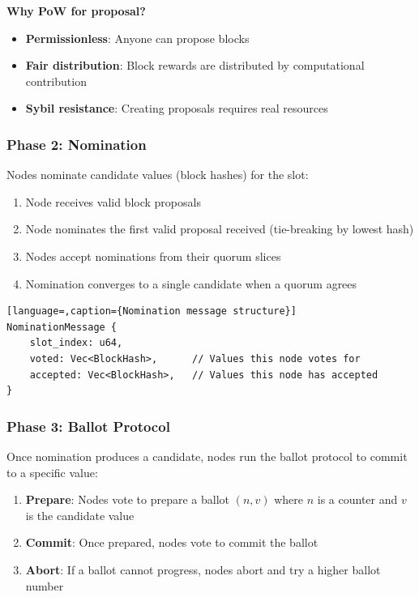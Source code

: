\textbf{Why PoW for proposal?}
\begin{itemize}
  \item \textbf{Permissionless}: Anyone can propose blocks
  \item \textbf{Fair distribution}: Block rewards are distributed by
    computational contribution
  \item \textbf{Sybil resistance}: Creating proposals requires real resources
\end{itemize}

\subsubsection{Phase 2: Nomination}

Nodes nominate candidate values (block hashes) for the slot:

\begin{enumerate}
  \item Node receives valid block proposals
  \item Node nominates the first valid proposal received (tie-breaking by
    lowest hash)
  \item Nodes accept nominations from their quorum slices
  \item Nomination converges to a single candidate when a quorum agrees
\end{enumerate}

\begin{lstlisting}[language=,caption={Nomination message structure}]
NominationMessage {
    slot_index: u64,
    voted: Vec<BlockHash>,      // Values this node votes for
    accepted: Vec<BlockHash>,   // Values this node has accepted
}
\end{lstlisting}

\subsubsection{Phase 3: Ballot Protocol}

Once nomination produces a candidate, nodes run the ballot protocol to
commit to a specific value:

\begin{enumerate}
  \item \textbf{Prepare}: Nodes vote to prepare a ballot $(n, v)$ where
    $n$ is a counter and $v$ is the candidate value
  \item \textbf{Commit}: Once prepared, nodes vote to commit the ballot
  \item \textbf{Abort}: If a ballot cannot progress, nodes abort and try
    a higher ballot number
\end{enumerate}

